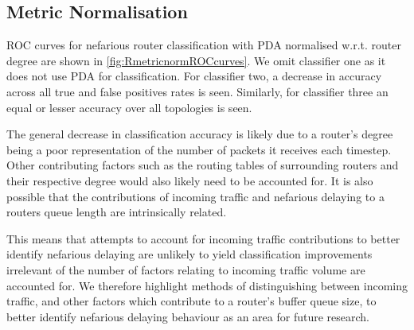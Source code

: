 \subsection{Metric Normalisation}
\label{ssec:Rmetricnormilisation}
ROC curves for nefarious router classification with PDA normalised w.r.t. router degree are shown in \cref{fig:RmetricnormROCcurves}. We omit classifier one as it does not use PDA for classification. For classifier two, a decrease in accuracy across all true and false positives rates is seen. Similarly, for classifier three an equal or lesser accuracy over all topologies is seen.\par
The general decrease in classification accuracy is likely due to a router's degree being a poor representation of the number of packets it receives each timestep. Other contributing factors such as the routing tables of surrounding routers and their respective degree would also likely need to be accounted for. It is also possible that the contributions of incoming traffic and nefarious delaying to a routers queue length are intrinsically related.\par
This means that attempts to account for incoming traffic contributions to better identify nefarious delaying are unlikely to yield classification improvements irrelevant of the number of factors relating to incoming traffic volume are accounted for. We therefore highlight methods of distinguishing between incoming traffic, and other factors which contribute to a router's buffer queue size, to better identify nefarious delaying behaviour as an area for future research.\par
\noindent
